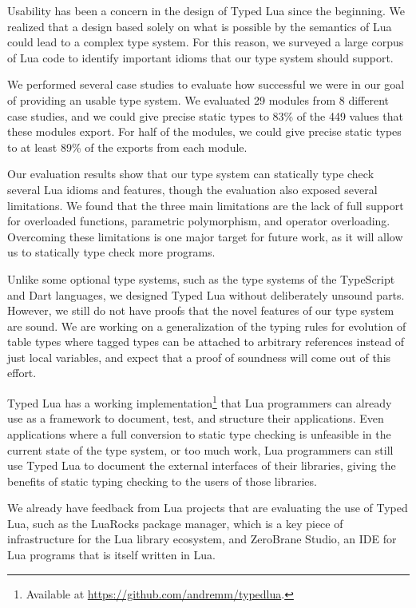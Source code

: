 \documentclass[10pt]{sigplanconf}
\begin{document}
Usability has been a concern in the design of Typed Lua since the beginning. We realized that a design based solely on what
is possible by the semantics of Lua could lead to a 
complex type system. For this reason, we surveyed a large
corpus of Lua code to identify important idioms that
our type system should support.

We performed several
case studies to evaluate how successful we were in our goal of
providing an usable type system.
We evaluated 29 modules from 8 different case studies,
and we could give precise static types to 83\% of the 449
values that these modules export.
For half of the modules, we could give precise static types to
at least 89\% of the exports from each module.

Our evaluation results show that our type system can statically
type check several Lua idioms and features, though the evaluation
also exposed several limitations.
We found that the three main limitations are the lack of
full support for overloaded functions, parametric polymorphism,
and operator overloading.
Overcoming these limitations is one major target for future work,
as it will allow us to statically type check more programs.

Unlike some optional type systems, such as the type systems
of the TypeScript and Dart languages, we designed Typed Lua without deliberately unsound parts.
However, we still do not have proofs that the novel features of
our type system are sound. We are working on a generalization
of the typing rules for evolution of table types where tagged
types can be attached to arbitrary references instead of
just local variables, and expect that a proof of soundness
will come out of this effort.

Typed Lua has a working implementation\footnote{Available at
\url{https://github.com/andremm/typedlua}.}
that Lua programmers can already use as a framework to
document, test, and structure their applications.
Even applications where a full conversion to static
type checking is unfeasible in the current state
of the type system, or too much work,
Lua programmers can still use Typed Lua to document the
external interfaces of their libraries, giving the benefits of static typing
checking to the users of those libraries.

We already have feedback from Lua projects
that are evaluating the use of Typed Lua, such
as the LuaRocks package manager, which is a key
piece of infrastructure for the Lua library ecosystem,
and ZeroBrane Studio, an IDE for Lua programs that is itself
written in Lua.



\end{document}
